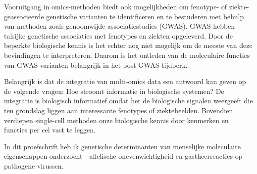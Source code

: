 \documentclass{book}
\begin{document}
Vooruitgang in omics-methoden biedt ook mogelijkheden om fenotype- of ziekte-geassocieerde genetische varianten te identificeren en te bestuderen met behulp van methoden zoals genoomwijde associatiestudies (GWAS).
GWAS hebben talrijke genetische associaties met fenotypes en ziekten opgeleverd.
Door de beperkte biologische kennis is het echter nog niet mogelijk om de meeste van deze bevindingen te interpreteren.
Daarom is het ontleden van de moleculaire functies van GWAS-varianten belangrijk in het post-GWAS tijdperk.

Belangrijk is dat de integratie van multi-omics data een antwoord kan geven op de volgende vragen: Hoe stroomt informatie in biologische systemen?
De integratie is biologisch informatief omdat het de biologische signalen weergeeft die ten grondslag liggen aan interessante fenotypes of ziektebeelden.
Bovendien verdiepen single-cell methoden onze biologische kennis door kenmerken en functies per cel vast te leggen.

In dit proefschrift heb ik genetische determinanten van menselijke moleculaire eigenschappen onderzocht - allelische onevenwichtigheid en gastheerreacties op pathogene virussen.
\end{document}
